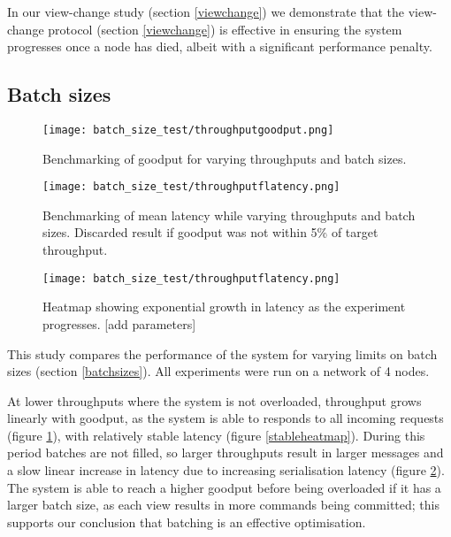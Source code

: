 In our view-change study (section \ref{viewchange}) we demonstrate that the view-change protocol (section \ref{viewchange}) is effective in ensuring the system progresses once a node has died, albeit with a significant performance penalty.

\subsection{Batch sizes} \label{batchsizeseval}

\begin{figure}[h!]
\centering
\texttt{[image: batch\_size\_test/throughputgoodput.png]}
\caption{Benchmarking of goodput for varying throughputs and batch sizes.}
\label{throughputgoodputbatch}
\end{figure}

\begin{figure}[h!]
\centering
\texttt{[image: batch\_size\_test/throughputflatency.png]}
\caption{Benchmarking of mean latency while varying throughputs and batch sizes. Discarded result if goodput was not within 5\% of target throughput.}
\label{throughputlatencybatch}
\end{figure}

\begin{figure}[h!]
\centering
\texttt{[image: batch\_size\_test/throughputflatency.png]}
\caption{Heatmap showing exponential growth in latency as the experiment progresses. [add parameters]}
\label{expheatmap}
\end{figure}

This study compares the performance of the system for varying limits on batch sizes (section \ref{batchsizes}). All experiments were run on a network of 4 nodes.

At lower throughputs where the system is not overloaded, throughput grows linearly with goodput, as the system is able to responds to all incoming requests (figure \ref{throughputgoodputbatch}), with relatively stable latency (figure \ref{stableheatmap}). During this period batches are not filled, so larger throughputs result in larger messages and a slow linear increase in latency due to increasing serialisation latency (figure \ref{throughputlatencybatch}). The system is able to reach a higher goodput before being overloaded if it has a larger batch size, as each view results in more commands being committed; this supports our conclusion that batching is an effective optimisation.


